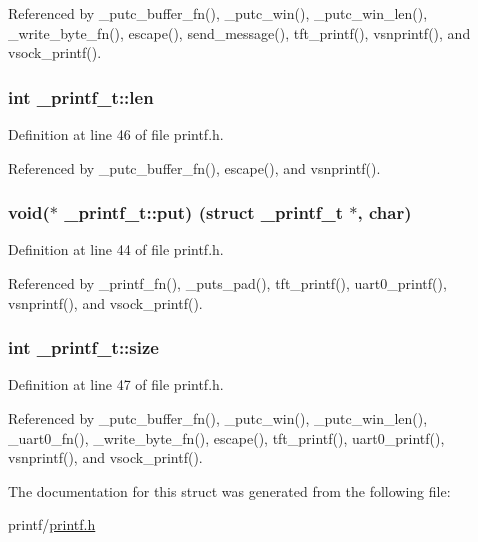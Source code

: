 Referenced by \+\_\+putc\+\_\+buffer\+\_\+fn(), \+\_\+putc\+\_\+win(), \+\_\+putc\+\_\+win\+\_\+len(), \+\_\+write\+\_\+byte\+\_\+fn(), escape(), send\+\_\+message(), tft\+\_\+printf(), vsnprintf(), and vsock\+\_\+printf().

\subsubsection[{\texorpdfstring{len}{len}}]{\setlength{\rightskip}{0pt plus 5cm}int \+\_\+printf\+\_\+t\+::len}\hypertarget{struct__printf__t_a5139902cde74159b79e6418a34712bee}{}\label{struct__printf__t_a5139902cde74159b79e6418a34712bee}


Definition at line 46 of file printf.\+h.



Referenced by \+\_\+putc\+\_\+buffer\+\_\+fn(), escape(), and vsnprintf().

\subsubsection[{\texorpdfstring{put}{put}}]{\setlength{\rightskip}{0pt plus 5cm}void($\ast$ \+\_\+printf\+\_\+t\+::put) (struct {\bf \+\_\+printf\+\_\+t} $\ast$, char)}\hypertarget{struct__printf__t_a3ef8eb0143b93d4446b04c6ce9313be7}{}\label{struct__printf__t_a3ef8eb0143b93d4446b04c6ce9313be7}


Definition at line 44 of file printf.\+h.



Referenced by \+\_\+printf\+\_\+fn(), \+\_\+puts\+\_\+pad(), tft\+\_\+printf(), uart0\+\_\+printf(), vsnprintf(), and vsock\+\_\+printf().

\subsubsection[{\texorpdfstring{size}{size}}]{\setlength{\rightskip}{0pt plus 5cm}int \+\_\+printf\+\_\+t\+::size}\hypertarget{struct__printf__t_a38c7a430cec9b063bf6df7a100d3abaa}{}\label{struct__printf__t_a38c7a430cec9b063bf6df7a100d3abaa}


Definition at line 47 of file printf.\+h.



Referenced by \+\_\+putc\+\_\+buffer\+\_\+fn(), \+\_\+putc\+\_\+win(), \+\_\+putc\+\_\+win\+\_\+len(), \+\_\+uart0\+\_\+fn(), \+\_\+write\+\_\+byte\+\_\+fn(), escape(), tft\+\_\+printf(), uart0\+\_\+printf(), vsnprintf(), and vsock\+\_\+printf().



The documentation for this struct was generated from the following file\+:\begin{DoxyCompactItemize}
\item 
printf/\hyperlink{printf_8h}{printf.\+h}\end{DoxyCompactItemize}
